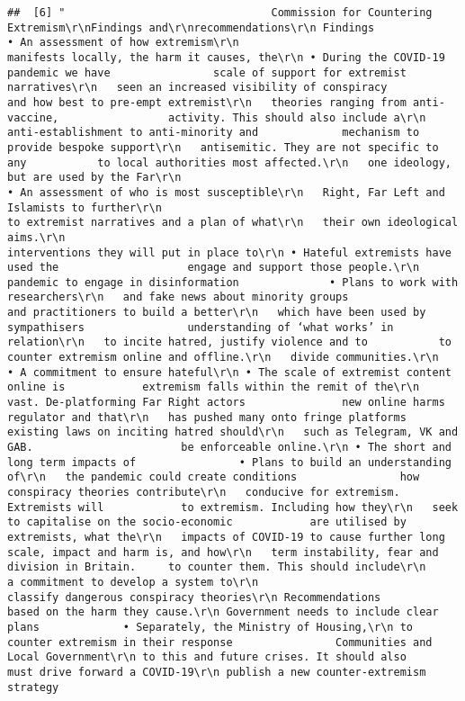 \documentclass[
]{book}
\begin{document}
\begin{verbatim}
##  [6] "                                Commission for Countering Extremism\r\nFindings and\r\nrecommendations\r\n Findings                                            • An assessment of how extremism\r\n                                                       manifests locally, the harm it causes, the\r\n • During the COVID-19 pandemic we have                scale of support for extremist narratives\r\n   seen an increased visibility of conspiracy          and how best to pre-empt extremist\r\n   theories ranging from anti-vaccine,                 activity. This should also include a\r\n   anti-establishment to anti-minority and             mechanism to provide bespoke support\r\n   antisemitic. They are not specific to any           to local authorities most affected.\r\n   one ideology, but are used by the Far\r\n                                                     • An assessment of who is most susceptible\r\n   Right, Far Left and Islamists to further\r\n                                                       to extremist narratives and a plan of what\r\n   their own ideological aims.\r\n                                                       interventions they will put in place to\r\n • Hateful extremists have used the                    engage and support those people.\r\n   pandemic to engage in disinformation              • Plans to work with researchers\r\n   and fake news about minority groups                 and practitioners to build a better\r\n   which have been used by sympathisers                understanding of ‘what works’ in relation\r\n   to incite hatred, justify violence and to           to counter extremism online and offline.\r\n   divide communities.\r\n                                                     • A commitment to ensure hateful\r\n • The scale of extremist content online is            extremism falls within the remit of the\r\n   vast. De-platforming Far Right actors               new online harms regulator and that\r\n   has pushed many onto fringe platforms               existing laws on inciting hatred should\r\n   such as Telegram, VK and GAB.                       be enforceable online.\r\n • The short and long term impacts of                • Plans to build an understanding of\r\n   the pandemic could create conditions                how conspiracy theories contribute\r\n   conducive for extremism. Extremists will            to extremism. Including how they\r\n   seek to capitalise on the socio-economic            are utilised by extremists, what the\r\n   impacts of COVID-19 to cause further long           scale, impact and harm is, and how\r\n   term instability, fear and division in Britain.     to counter them. This should include\r\n                                                       a commitment to develop a system to\r\n                                                       classify dangerous conspiracy theories\r\n Recommendations                                       based on the harm they cause.\r\n Government needs to include clear plans             • Separately, the Ministry of Housing,\r\n to counter extremism in their response                Communities and Local Government\r\n to this and future crises. It should also             must drive forward a COVID-19\r\n publish a new counter-extremism strategy 
\end{verbatim}
\end{document}

